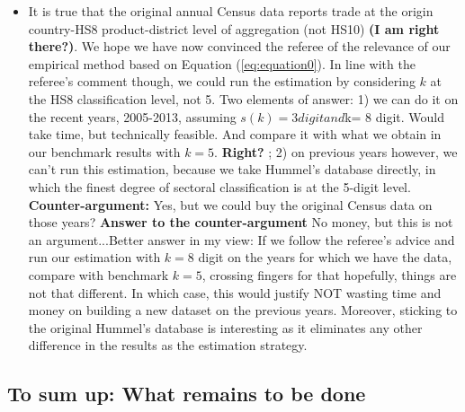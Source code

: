 \documentclass[a4paper,12pt]{article}
\begin{document}
\begin{itemize}
\item[\text{Answer}] It is true that the original annual Census data reports trade at the origin country-HS8 product-district level of aggregation (not HS10) \textbf{(I am right there?)}. We hope we have now convinced the referee of the relevance of our empirical method based on Equation (\ref{eq:equation0}). In line with the referee's comment though, we could run the estimation by considering $k$ at the HS8 classification level, not 5. Two elements of answer: 1) we can do it on the recent years, 2005-2013, assuming $s(k) = 3 digit and $k= 8 digit. Would take time, but technically feasible. And compare it with what we obtain in our benchmark results with $k=5$. \textbf{Right?} ; 2) on previous years however, we can't run this estimation, because we take Hummel's database directly, in which the finest degree of sectoral classification is at the 5-digit level. \textbf{Counter-argument:} Yes, but we could buy the original Census data on those years? \textbf{Answer to the counter-argument} No money, but this is not an argument...Better answer in my view: If we follow the referee's advice and run our estimation with $k=8$ digit on the years for which we have the data, compare with benchmark $k=5$, crossing fingers for that hopefully, things are not that different. In which case, this would justify NOT wasting time and money on building a new dataset on the previous years. Moreover, sticking to the original Hummel's database is interesting as it eliminates any other difference in the results as the estimation strategy.

\end{itemize}


\subsection{To sum up: What remains to be done}
\end{document}
